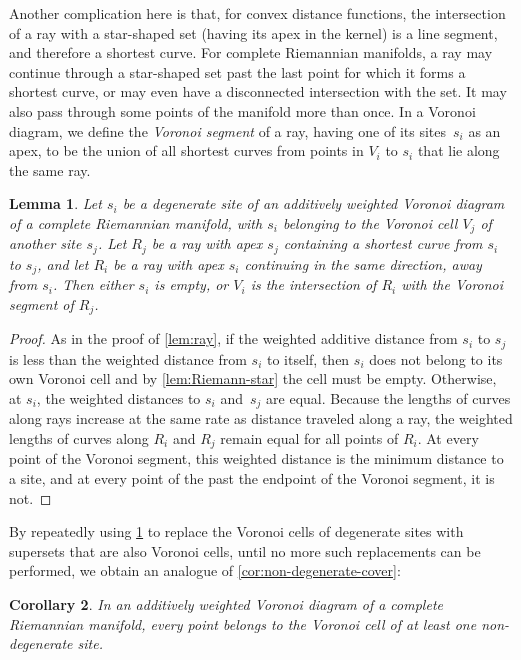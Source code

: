 \documentclass[11pt]{article}
\newtheorem{lemma}{Lemma}
\newtheorem{corollary}[lemma]{Corollary}
\theoremstyle{definition}
\begin{document}
Another complication here is that, for convex distance functions, the intersection of a ray with a star-shaped set (having its apex in the kernel) is a line segment, and therefore a shortest curve. For  complete Riemannian manifolds, a ray may continue through a star-shaped set past the last point for which it forms a shortest curve, or may even have a disconnected intersection with the set. It may also pass through some points of the manifold more than once.  In a Voronoi diagram, we define the \emph{Voronoi segment} of a ray, having one of its sites~$s_i$ as an apex, to be the union of all shortest curves from points in $V_i$ to $s_i$ that lie along the same ray.

\begin{lemma}
\label{lem:Riemann-ray}
Let $s_i$ be a degenerate site of an additively weighted Voronoi diagram of a complete Riemannian manifold, with $s_i$ belonging to the Voronoi cell $V_j$ of another site $s_j$. Let $R_j$ be a ray with apex $s_j$ containing a shortest curve from $s_i$ to $s_j$, and let $R_i$ be a ray with apex $s_i$ continuing in the same direction, away from $s_i$. Then either $s_i$ is empty, or $V_i$ is the intersection of $R_i$ with the Voronoi segment of $R_j$.
\end{lemma}

\begin{proof}
As in the proof of \cref{lem:ray}, if the weighted additive distance from $s_i$ to $s_j$ is less than the weighted distance from $s_i$ to itself, then $s_i$ does not belong to its own Voronoi cell and by \cref{lem:Riemann-star} the cell must be empty. Otherwise, at $s_i$, the weighted distances to $s_i$ and~$s_j$ are equal. Because the lengths of curves along rays increase at the same rate as distance traveled along a ray, the weighted lengths of curves along $R_i$ and $R_j$ remain equal for all points of $R_i$. At every point of the Voronoi segment, this weighted distance is the minimum distance to a site, and at every point of the past the endpoint of the Voronoi segment, it is not.
\end{proof}

By repeatedly using \cref{lem:Riemann-ray} to replace the Voronoi cells of degenerate sites with supersets that are also Voronoi cells, until no more such replacements can be performed, we obtain an analogue of \cref{cor:non-degenerate-cover}:

\begin{corollary}
In an additively weighted Voronoi diagram of a complete Riemannian manifold, every point belongs to the Voronoi cell of at least one non-degenerate site.
\end{corollary}
\end{document}

